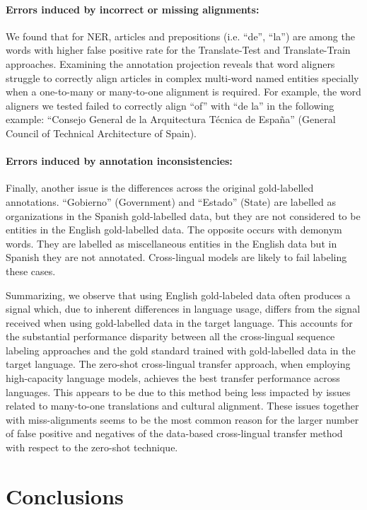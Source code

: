 \paragraph{Errors induced by incorrect or missing alignments:} We found that for NER, articles and prepositions (i.e. ``de'', ``la'') are among the words with higher false positive rate for the Translate-Test and Translate-Train approaches. Examining the annotation projection reveals that word aligners struggle to correctly align articles in complex multi-word named entities specially when a one-to-many or many-to-one alignment is required. For example, the word aligners we tested failed to correctly align ``of'' with ``de la'' in the following example: ``Consejo General de la Arquitectura Técnica de España'' (General Council of Technical Architecture of Spain).

\paragraph{Errors induced by annotation inconsistencies:} Finally, another issue is the differences across the original gold-labelled annotations. ``Gobierno'' (Government) and ``Estado'' (State) are labelled as organizations in the Spanish gold-labelled data, but they are not considered to be entities in the English gold-labelled data. The opposite occurs with demonym words. They are labelled as miscellaneous entities in the English data but in Spanish they are not annotated. Cross-lingual models are likely to fail labeling these cases.

Summarizing, we observe that using English gold-labeled data often produces a signal which, due to inherent differences in language usage, differs from the signal received when using gold-labelled data in the target language. This accounts for the substantial performance disparity between all the cross-lingual sequence labeling approaches and the gold standard trained with gold-labelled data in the target language. The zero-shot cross-lingual transfer approach, when employing high-capacity language models, achieves the best transfer performance across languages. This appears to be due to this method being less impacted by issues related to many-to-one translations and cultural alignment. These issues together with miss-alignments seems to be the most common reason for the larger number of false positive and negatives of the data-based cross-lingual transfer method with respect to the zero-shot technique.


\section{Conclusions}

